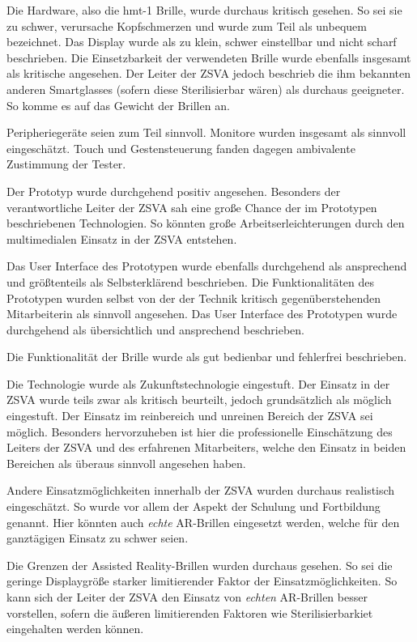 Die Hardware, also die hmt-1 Brille, wurde durchaus kritisch gesehen. So sei sie zu schwer, verursache Kopfschmerzen und wurde zum Teil als unbequem bezeichnet. Das Display wurde als zu klein, schwer einstellbar und nicht scharf beschrieben. Die Einsetzbarkeit der verwendeten Brille wurde ebenfalls insgesamt als kritische angesehen. Der Leiter der ZSVA jedoch beschrieb die ihm bekannten anderen Smartglasses (sofern diese Sterilisierbar wären) als durchaus geeigneter. So komme es auf das Gewicht der Brillen an. 

Peripheriegeräte seien zum Teil sinnvoll. Monitore wurden insgesamt als sinnvoll eingeschätzt. Touch und Gestensteuerung fanden dagegen ambivalente Zustimmung der Tester.

Der Prototyp wurde durchgehend positiv angesehen. Besonders der verantwortliche Leiter der ZSVA sah eine große Chance der im Prototypen beschriebenen Technologien. So könnten große Arbeitserleichterungen durch den multimedialen Einsatz in der ZSVA entstehen. 

Das User Interface des Prototypen wurde ebenfalls durchgehend als ansprechend und größtenteils als Selbsterklärend beschrieben. Die Funktionalitäten des Prototypen wurden selbst von der der Technik kritisch gegenüberstehenden Mitarbeiterin als sinnvoll angesehen. Das User Interface des Prototypen wurde durchgehend als übersichtlich und ansprechend beschrieben.

Die Funktionalität der Brille wurde als gut bedienbar und fehlerfrei beschrieben.

Die Technologie wurde als Zukunftstechnologie eingestuft. Der Einsatz in der ZSVA wurde teils zwar als kritisch beurteilt, jedoch grundsätzlich als möglich eingestuft. Der Einsatz im reinbereich und unreinen Bereich der ZSVA sei möglich. Besonders hervorzuheben ist hier die professionelle Einschätzung des Leiters der ZSVA und des erfahrenen Mitarbeiters, welche den Einsatz in beiden Bereichen als überaus sinnvoll angesehen haben.

Andere Einsatzmöglichkeiten innerhalb der ZSVA wurden durchaus realistisch eingeschätzt. So wurde vor allem der Aspekt der Schulung und Fortbildung genannt. Hier könnten auch \emph{echte} AR-Brillen eingesetzt werden, welche für den ganztägigen Einsatz zu schwer seien.

Die Grenzen der Assisted Reality-Brillen wurden durchaus gesehen. So sei die geringe Displaygröße starker limitierender Faktor der Einsatzmöglichkeiten. So kann sich der Leiter der ZSVA den Einsatz von \emph{echten} AR-Brillen besser vorstellen, sofern die äußeren limitierenden Faktoren wie Sterilisierbarkiet eingehalten werden können.


